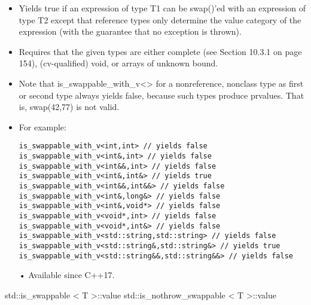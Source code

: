 \begin{itemize}
\item
Yields true if an expression of type T1 can be swap()’ed with an expression of type T2 except that reference types only determine the value category of the expression (with the guarantee that no exception is thrown).

\item
Requires that the given types are either complete (see Section 10.3.1 on page 154), (cv-qualified) void, or arrays of unknown bound.

\item
Note that is\_swappable\_with\_v<> for a nonreference, nonclass type as first or second type always yields false, because such types produce prvalues. That is, swap(42,77) is not valid.

\item
For example:
\begin{lstlisting}[style=styleCXX]
is_swappable_with_v<int,int> // yields false
is_swappable_with_v<int&,int> // yields false
is_swappable_with_v<int&&,int> // yields false
is_swappable_with_v<int&,int&> // yields true
is_swappable_with_v<int&&,int&&> // yields false
is_swappable_with_v<int&,long&> // yields false
is_swappable_with_v<int&,void*> // yields false
is_swappable_with_v<void*,int> // yields false
is_swappable_with_v<void*,int&> // yields false
is_swappable_with_v<std::string,std::string> // yields false
is_swappable_with_v<std::string&,std::string&> // yields true
is_swappable_with_v<std::string&&,std::string&&> // yields false
\end{lstlisting}

• Available since C++17.
\end{itemize}

std::is\_swappable < T >::value
std::is\_nothrow\_swappable < T >::value

